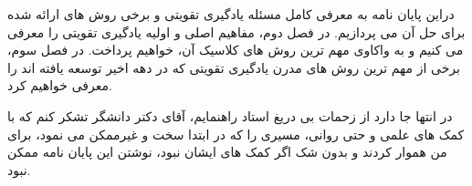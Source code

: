 \newpage
\vspace{-1cm}


دراین پایان نامه به معرفی کامل مسئله یادگیری تقویتی و برخی روش های ارائه شده برای حل آن می پردازیم. در فصل دوم، مفاهیم اصلی و اولیه یادگیری تقویتی را معرفی می کنیم و به واکاوی مهم ترین روش های کلاسیک آن، خواهیم پرداخت.
در فصل سوم، برخی از مهم ترین روش های مدرن یادگیری تقویتی که در دهه اخیر توسعه یافته اند را معرفی خواهیم کرد. 

در انتها جا دارد از زحمات بی دریغ استاد راهنمایم، آقای دکتر دانشگر تشکر کنم که با کمک های علمی و حتی روانی، مسیری را که در ابتدا سخت و غیرممکن می نمود، برای من هموار کردند و بدون شک اگر کمک های ایشان نبود، نوشتن این پایان نامه ممکن نبود.